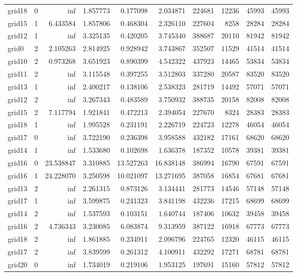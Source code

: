 \begin{longtable}{|l|r|r|r|r|r|r|r|r|r|}
grid18 & 0 & inf & 1.857773 & 0.177098 & 2.034871 & 224681 & 12236 & 45993 & 45993 \\
grid15 & 1 & 6.433584 & 1.857806 & 0.468304 & 2.326110 & 227604 & 8258 & 28284 & 28284 \\
grid12 & 1 & inf & 3.325135 & 0.420205 & 3.745340 & 388687 & 20110 & 81942 & 81942 \\
grid0 & 2 & 2.105263 & 2.814925 & 0.928942 & 3.743867 & 352507 & 11529 & 41514 & 41514 \\
grid10 & 2 & 0.973268 & 3.651923 & 0.890399 & 4.542322 & 437923 & 14465 & 53834 & 53834 \\
grid11 & 2 & inf & 3.115548 & 0.397255 & 3.512803 & 337280 & 20587 & 83520 & 83520 \\
grid13 & 1 & inf & 2.400217 & 0.138106 & 2.538323 & 281719 & 14492 & 57071 & 57071 \\
grid12 & 2 & inf & 3.267343 & 0.483589 & 3.750932 & 388735 & 20158 & 82008 & 82008 \\
grid15 & 2 & 7.117794 & 1.921841 & 0.472213 & 2.394054 & 227670 & 8324 & 28383 & 28383 \\
grid18 & 1 & inf & 1.995528 & 0.231191 & 2.226719 & 224723 & 12278 & 46054 & 46054 \\
grid17 & 0 & inf & 3.722190 & 0.236398 & 3.958588 & 432182 & 17161 & 68620 & 68620 \\
grid14 & 1 & inf & 1.533680 & 0.102698 & 1.636378 & 187352 & 10578 & 39381 & 39381 \\
grid16 & 0 & 23.538847 & 3.310885 & 13.527263 & 16.838148 & 386994 & 16790 & 67591 & 67591 \\
grid16 & 1 & 24.228070 & 3.250598 & 10.021097 & 13.271695 & 387058 & 16854 & 67681 & 67681 \\
grid13 & 2 & inf & 2.261315 & 0.873126 & 3.134441 & 281773 & 14546 & 57148 & 57148 \\
grid17 & 1 & inf & 3.599875 & 0.241323 & 3.841198 & 432236 & 17215 & 68699 & 68699 \\
grid14 & 2 & inf & 1.537593 & 0.103151 & 1.640744 & 187406 & 10632 & 39458 & 39458 \\
grid16 & 2 & 4.736343 & 3.230085 & 6.083874 & 9.313959 & 387122 & 16918 & 67773 & 67773 \\
grid18 & 2 & inf & 1.861885 & 0.234911 & 2.096796 & 224765 & 12320 & 46115 & 46115 \\
grid17 & 2 & inf & 3.839599 & 0.261312 & 4.100911 & 432292 & 17271 & 68781 & 68781 \\
grid20 & 0 & inf & 1.734019 & 0.219106 & 1.953125 & 197691 & 15160 & 57812 & 57812 \\

\end{longtable}
